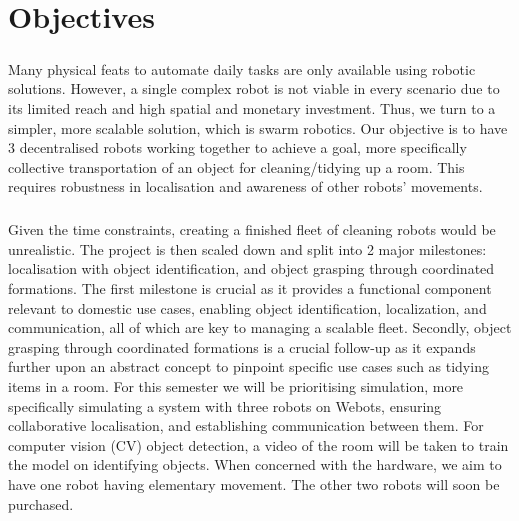\chapter{Objectives}

\paragraph*{}
Many physical feats to automate daily tasks are only available using robotic solutions. However, a single complex robot is not viable in every scenario due to its limited reach and high spatial and monetary investment. Thus, we turn to a simpler, more scalable solution, which is swarm robotics. Our objective is to have 3 decentralised robots working together to achieve a goal, more specifically collective transportation of an object for cleaning/tidying up a room. This requires robustness in localisation and awareness of other robots' movements.

\paragraph*{}
Given the time constraints, creating a finished fleet of cleaning robots would be unrealistic. The project is then scaled down and split into 2 major milestones: localisation with object identification, and object grasping through coordinated formations. The first milestone is crucial as it provides a functional component relevant to domestic use cases, enabling object identification, localization, and communication, all of which are key to managing a scalable fleet. Secondly, object grasping through coordinated formations is a crucial follow-up as it expands further upon an abstract concept to pinpoint specific use cases such as tidying items in a room.  For this semester we will be prioritising simulation, more specifically simulating a system with three robots on Webots, ensuring collaborative localisation, and establishing communication between them. For computer vision (CV) object detection, a video of the room will be taken to train the model on identifying objects. When concerned with the hardware, we aim to have one robot having elementary movement. The other two robots will soon be purchased.

